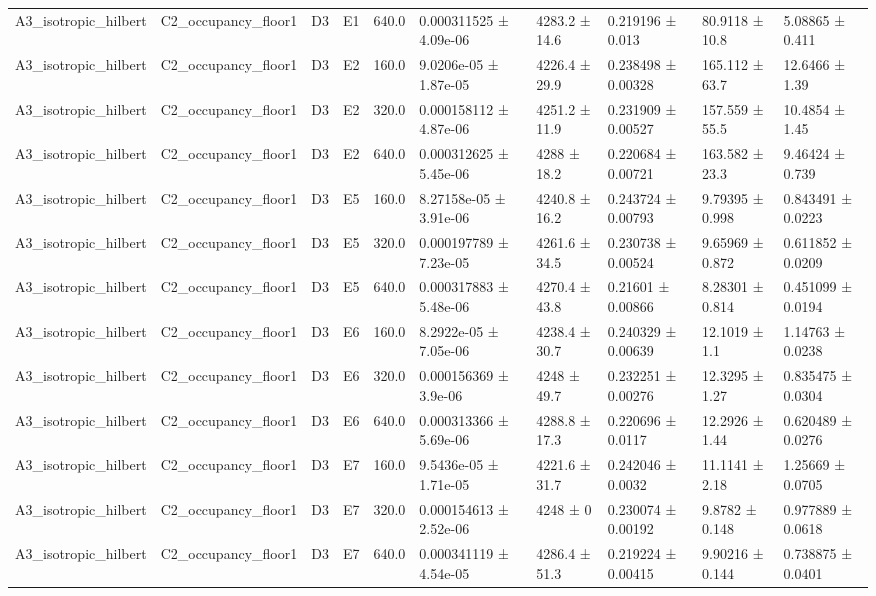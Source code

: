 \begin{table}
\begin{tabular}{llllllllll}
A3\_isotropic\_hilbert & C2\_occupancy\_floor1 & D3 & E1 & 640.0 & 0.000311525 ± 4.09e-06 & 4283.2 ± 14.6 & 0.219196 ± 0.013 & 80.9118 ± 10.8 & 5.08865 ± 0.411 \\
A3\_isotropic\_hilbert & C2\_occupancy\_floor1 & D3 & E2 & 160.0 & 9.0206e-05 ± 1.87e-05 & 4226.4 ± 29.9 & 0.238498 ± 0.00328 & 165.112 ± 63.7 & 12.6466 ± 1.39 \\
A3\_isotropic\_hilbert & C2\_occupancy\_floor1 & D3 & E2 & 320.0 & 0.000158112 ± 4.87e-06 & 4251.2 ± 11.9 & 0.231909 ± 0.00527 & 157.559 ± 55.5 & 10.4854 ± 1.45 \\
A3\_isotropic\_hilbert & C2\_occupancy\_floor1 & D3 & E2 & 640.0 & 0.000312625 ± 5.45e-06 & 4288 ± 18.2 & 0.220684 ± 0.00721 & 163.582 ± 23.3 & 9.46424 ± 0.739 \\
A3\_isotropic\_hilbert & C2\_occupancy\_floor1 & D3 & E5 & 160.0 & 8.27158e-05 ± 3.91e-06 & 4240.8 ± 16.2 & 0.243724 ± 0.00793 & 9.79395 ± 0.998 & 0.843491 ± 0.0223 \\
A3\_isotropic\_hilbert & C2\_occupancy\_floor1 & D3 & E5 & 320.0 & 0.000197789 ± 7.23e-05 & 4261.6 ± 34.5 & 0.230738 ± 0.00524 & 9.65969 ± 0.872 & 0.611852 ± 0.0209 \\
A3\_isotropic\_hilbert & C2\_occupancy\_floor1 & D3 & E5 & 640.0 & 0.000317883 ± 5.48e-06 & 4270.4 ± 43.8 & 0.21601 ± 0.00866 & 8.28301 ± 0.814 & 0.451099 ± 0.0194 \\
A3\_isotropic\_hilbert & C2\_occupancy\_floor1 & D3 & E6 & 160.0 & 8.2922e-05 ± 7.05e-06 & 4238.4 ± 30.7 & 0.240329 ± 0.00639 & 12.1019 ± 1.1 & 1.14763 ± 0.0238 \\
A3\_isotropic\_hilbert & C2\_occupancy\_floor1 & D3 & E6 & 320.0 & 0.000156369 ± 3.9e-06 & 4248 ± 49.7 & 0.232251 ± 0.00276 & 12.3295 ± 1.27 & 0.835475 ± 0.0304 \\
A3\_isotropic\_hilbert & C2\_occupancy\_floor1 & D3 & E6 & 640.0 & 0.000313366 ± 5.69e-06 & 4288.8 ± 17.3 & 0.220696 ± 0.0117 & 12.2926 ± 1.44 & 0.620489 ± 0.0276 \\
A3\_isotropic\_hilbert & C2\_occupancy\_floor1 & D3 & E7 & 160.0 & 9.5436e-05 ± 1.71e-05 & 4221.6 ± 31.7 & 0.242046 ± 0.0032 & 11.1141 ± 2.18 & 1.25669 ± 0.0705 \\
A3\_isotropic\_hilbert & C2\_occupancy\_floor1 & D3 & E7 & 320.0 & 0.000154613 ± 2.52e-06 & 4248 ± 0 & 0.230074 ± 0.00192 & 9.8782 ± 0.148 & 0.977889 ± 0.0618 \\
A3\_isotropic\_hilbert & C2\_occupancy\_floor1 & D3 & E7 & 640.0 & 0.000341119 ± 4.54e-05 & 4286.4 ± 51.3 & 0.219224 ± 0.00415 & 9.90216 ± 0.144 & 0.738875 ± 0.0401 \\

\end{tabular}
\end{table}
